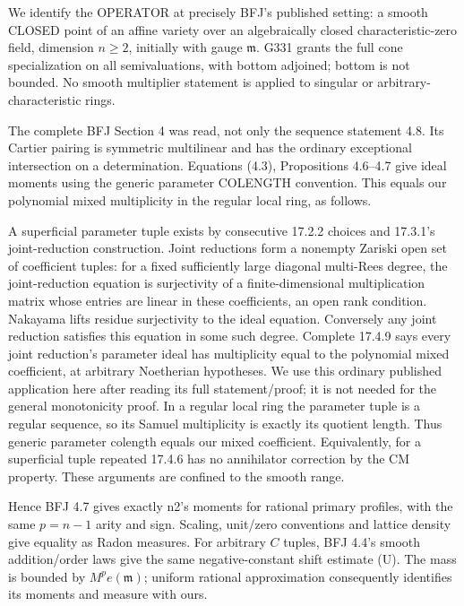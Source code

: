 We identify the OPERATOR at precisely BFJ's published setting: a smooth CLOSED point of an affine variety over an algebraically closed characteristic-zero field, dimension \(n\ge2\), initially with gauge \(\mathfrak m\). G331 grants the full cone specialization on all semivaluations, with bottom adjoined; bottom is not bounded. No smooth multiplier statement is applied to singular or arbitrary-characteristic rings.

The complete BFJ Section 4 was read, not only the sequence statement 4.8. Its Cartier pairing is symmetric multilinear and has the ordinary exceptional intersection on a determination. Equations (4.3), Propositions 4.6--4.7 give ideal moments using the generic parameter COLENGTH convention. This equals our polynomial mixed multiplicity in the regular local ring, as follows.

A superficial parameter tuple exists by consecutive 17.2.2 choices and 17.3.1's joint-reduction construction. Joint reductions form a nonempty Zariski open set of coefficient tuples: for a fixed sufficiently large diagonal multi-Rees degree, the joint-reduction equation is surjectivity of a finite-dimensional multiplication matrix whose entries are linear in these coefficients, an open rank condition. Nakayama lifts residue surjectivity to the ideal equation. Conversely any joint reduction satisfies this equation in some such degree. Complete 17.4.9 says every joint reduction's parameter ideal has multiplicity equal to the polynomial mixed coefficient, at arbitrary Noetherian hypotheses. We use this ordinary published application here after reading its full statement/proof; it is not needed for the general monotonicity proof. In a regular local ring the parameter tuple is a regular sequence, so its Samuel multiplicity is exactly its quotient length. Thus generic parameter colength equals our mixed coefficient. Equivalently, for a superficial tuple repeated 17.4.6 has no annihilator correction by the CM property. These arguments are confined to the smooth range.

Hence BFJ 4.7 gives exactly n2's moments for rational primary profiles, with the same \(p=n-1\) arity and sign. Scaling, unit/zero conventions and lattice density give equality as Radon measures. For arbitrary \(C\) tuples, BFJ 4.4's smooth addition/order laws give the same negative-constant shift estimate (U). The mass is bounded by \(M^pe(\mathfrak m)\); uniform rational approximation consequently identifies its moments and measure with ours.

